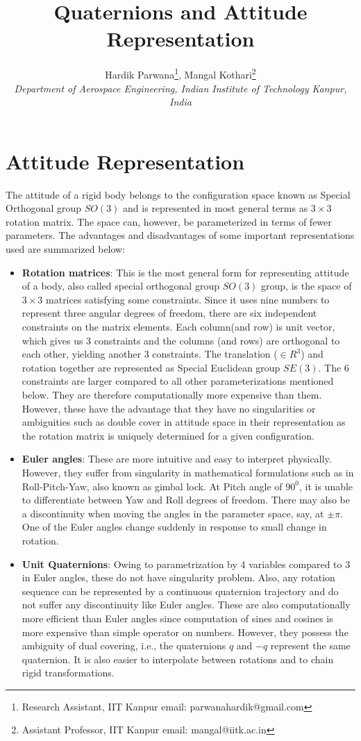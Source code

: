\documentclass{article}
\author{Hardik Parwana\footnote{Research Assistant, IIT Kanpur email: parwanahardik@gmail.com}, Mangal Kothari\footnote{Assistant Professor, IIT Kanpur email: mangal@iitk.ac.in}\\ \textit{Department of Aerospace Engineering, Indian Institute of Technology Kanpur, India}}
\title{Quaternions and Attitude Representation}
\date{}
\begin{document}
	\maketitle

\section{Attitude Representation}

The attitude of a rigid body belongs to the configuration space known as Special Orthogonal group $ SO(3) $ and is represented in most general terms as $3\times 3$ rotation matrix. The space can, however, be parameterized in terms of fewer parameters. The advantages and disadvantages of some important representations used are summarized below:

\begin{itemize}
	\item \textbf{Rotation matrices}: This is the most general form for representing attitude of a body, also called special orthogonal group $ SO(3) $ group, is the space of $3\times 3$ matrices satisfying some constraints. Since it uses nine numbers to represent three angular degrees of freedom, there are six independent constraints on the matrix elements. Each column(and row) is unit vector, which gives us 3 constraints and the columns (and rows) are orthogonal to each other, yielding another 3 constraints. The translation ($\in R^3$) and rotation together are represented as Special Euclidean group $SE(3)$. The 6 constraints are larger compared to all other parameterizations mentioned below. They are therefore computationally more expensive than them. However, these have the advantage that they have no singularities or ambiguities such as double cover in attitude space in their representation as the rotation matrix is uniquely determined for a given configuration.
	
	\item \textbf{Euler angles}: These are more intuitive and easy to interpret physically. However, they suffer from singularity in mathematical formulations such as in Roll-Pitch-Yaw, also known as gimbal lock. At Pitch angle of $90^0$, it is unable to differentiate between Yaw and Roll degrees of freedom. There may also be a discontinuity when moving the angles in the parameter space, say, at $\pm\pi$. One of the Euler angles change suddenly in response to small change in rotation.
	
	\item \textbf{Unit Quaternions}: Owing to parametrization by 4 variables compared to 3 in Euler angles, these do not have singularity problem. Also, any rotation sequence can be represented by a continuous quaternion trajectory and do not suffer any discontinuity like Euler angles. These are also computationally more efficient than Euler angles since computation of sines and cosines is more expensive than simple operator on numbers. However, they possess the ambiguity of dual covering, i.e., the quaternions $q$ and $-q$ represent the same quaternion. It is also easier to interpolate between rotations and to chain rigid transformations.
		

\end{itemize}
\end{document}
